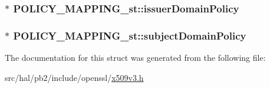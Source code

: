 \subsubsection[{\texorpdfstring{issuer\+Domain\+Policy}{issuerDomainPolicy}}]{$\ast$ P\+O\+L\+I\+C\+Y\+\_\+\+M\+A\+P\+P\+I\+N\+G\+\_\+st\+::issuer\+Domain\+Policy}\hypertarget{struct_p_o_l_i_c_y___m_a_p_p_i_n_g__st_a426cb055da517faf080f42de138bead3}{}\label{struct_p_o_l_i_c_y___m_a_p_p_i_n_g__st_a426cb055da517faf080f42de138bead3}
\subsubsection[{\texorpdfstring{subject\+Domain\+Policy}{subjectDomainPolicy}}]{$\ast$ P\+O\+L\+I\+C\+Y\+\_\+\+M\+A\+P\+P\+I\+N\+G\+\_\+st\+::subject\+Domain\+Policy}\hypertarget{struct_p_o_l_i_c_y___m_a_p_p_i_n_g__st_ad397a2367d90e97217ee96ff07ee5604}{}\label{struct_p_o_l_i_c_y___m_a_p_p_i_n_g__st_ad397a2367d90e97217ee96ff07ee5604}


The documentation for this struct was generated from the following file\+:\begin{DoxyCompactItemize}
\item 
src/hal/pb2/include/openssl/\hyperlink{x509v3_8h}{x509v3.\+h}\end{DoxyCompactItemize}
